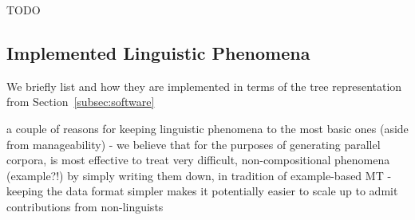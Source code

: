{%










\noindent\makebox[\linewidth]{\rule{\paperwidth}{0.4pt}} %
TODO

\subsection{Implemented Linguistic Phenomena}

We briefly list
and how they are implemented in terms of the tree representation from Section~\ref{subsec:software}

a couple of reasons for keeping linguistic phenomena to the most basic ones (aside from manageability)
- we believe that for the purposes of generating parallel corpora, is most effective to treat very difficult, non-compositional phenomena (example?!) by simply writing them down, in tradition of example-based MT
- keeping the data format simpler makes it potentially easier to scale up to admit contributions from non-linguists

}
